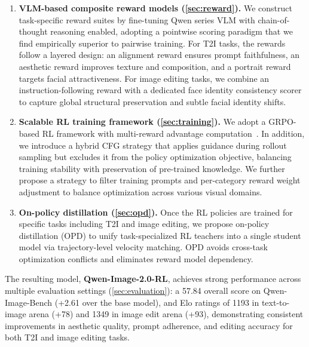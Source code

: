 \documentclass{article} %
\begin{document}
\begin{enumerate}[leftmargin=*,itemsep=2pt]
    \item \textbf{VLM-based composite reward models (\cref{sec:reward}).} We construct task-specific reward suites by fine-tuning Qwen series VLM with chain-of-thought reasoning enabled, adopting a pointwise scoring paradigm that we find empirically superior to pairwise training. For T2I tasks, the rewards follow a layered design: an alignment reward ensures prompt faithfulness, an aesthetic reward improves texture and composition, and a portrait reward targets facial attractiveness. For image editing tasks, we combine an instruction-following reward with a dedicated face identity consistency scorer to capture global structural preservation and subtle facial identity shifts.

    \item \textbf{Scalable RL training framework (\cref{sec:training}).} We adopt a GRPO-based RL framework with multi-reward advantage computation~\citep{shao2024deepseekmath,liu2026gdpo}. In addition, we introduce a hybrid CFG strategy that applies guidance during rollout sampling but excludes it from the policy optimization objective, balancing training stability with preservation of pre-trained knowledge. We further propose a strategy to filter training prompts and per-category reward weight adjustment to balance optimization across various visual domains.

    \item \textbf{On-policy distillation (\cref{sec:opd}).} Once the RL policies are trained for specific tasks including T2I and image editing, we propose on-policy distillation (OPD) to unify task-specialized RL teachers into a single student model via trajectory-level velocity matching. OPD avoids cross-task optimization conflicts and eliminates reward model dependency.
\end{enumerate}

The resulting model, \textbf{Qwen-Image-2.0-RL}, achieves strong performance across multiple evaluation settings (\cref{sec:evaluation}): a 57.84 overall score on Qwen-Image-Bench (+2.61 over the base model), and Elo ratings of 1193 in text-to-image arena (+78) and 1349 in image edit arena (+93), demonstrating consistent improvements in aesthetic quality, prompt adherence, and editing accuracy for both T2I and image editing tasks.
\end{document}
